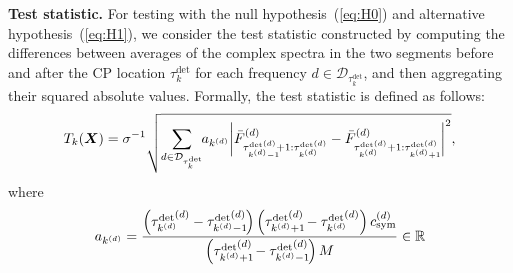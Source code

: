 \textbf{Test statistic.}
For testing with the null hypothesis~(\ref{eq:H0}) and alternative hypothesis~(\ref{eq:H1}), 
we consider the test statistic constructed by 
computing the differences between averages of the complex spectra in the two segments before and after the CP location $\tau_k^{\text{det}}$ for each frequency $d \in \mathcal{D}_{\tau_k^{\text{det}}}$, 
and then aggregating their squared absolute values. 
Formally, the test statistic is defined as follows:
\begin{align}
 \label{eq:teststatistic}
 T_k(\bm{X}) 
  = \sigma^{-1} \sqrt{\sum_{d \in \mathcal{D}_{\tau_k^{\text{det}}}} \hspace{-1mm} a_{k^{(d)}} \bigg{|} \bar{F}_{{{\tau_{k^{(d)}-1}^{\rm det}}^{\hspace{-4.3mm}(d)}+1:{\tau_{k^{(d)}}^{\text{det}}}^{\hspace{-1.2mm}(d)}}}^{(d)}
  - \bar{F}_{{\tau_{k^{(d)}}^{\text{det}}}^{\hspace{-1.2mm}(d)}+1:{\tau_{k^{(d)}+1}^{\rm det}}^{\hspace{-4.3mm}(d)}}^{(d)} \, \bigg{|}^2}, 
\end{align}
where
\begin{equation}
  a_{k^{(d)}} = \frac{\left({{\tau_{k^{(d)}}^{\text{det}}}^{\hspace{-0.7mm}(d)} - {\tau_{k^{(d)}-1}^{\rm det}}^{\hspace{-4.3mm}(d)}}\right) \left({\tau_{k^{(d)}+1}^{\rm det}}^{\hspace{-4.3mm}(d)} - {\tau_{k^{(d)}}^{\text{det}}}^{\hspace{-0.7mm}(d)}\right) c_{\text{sym}}^{(d)}}{\left({{\tau_{k^{(d)}+1}^{\rm det}}^{\hspace{-4.3mm}(d)} - {\tau_{k^{(d)}-1}^{\rm det}}^{\hspace{-4.3mm}(d)}}\right)M} \in \mathbb{R} \notag
\end{equation}

